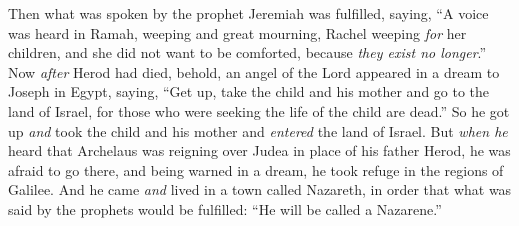 \begin{biblechapter}
\verse Then what was spoken by the prophet Jeremiah was fulfilled, saying,
\verse “A voice was heard in Ramah, 
weeping and great mourning, 
Rachel weeping \textit{for} her children, 
and she did not want to be comforted, 
because \textit{they exist no longer}.”
 Now \textit{after} Herod had died, behold, an angel of the Lord appeared in a dream to Joseph in Egypt,
\verse saying, “Get up, take the child and his mother and go to the land of Israel, for those who were seeking the life of the child are dead.”
\verse So he got up \textit{and} took the child and his mother and \textit{entered} the land of Israel.
\verse But \textit{when he} heard that Archelaus was reigning over Judea in place of his father Herod, he was afraid to go there, and being warned in a dream, he took refuge in the regions of Galilee.
\verse And he came \textit{and} lived in a town called Nazareth, in order that what was said by the prophets would be fulfilled: “He will be called a Nazarene.”
\end{biblechapter}

